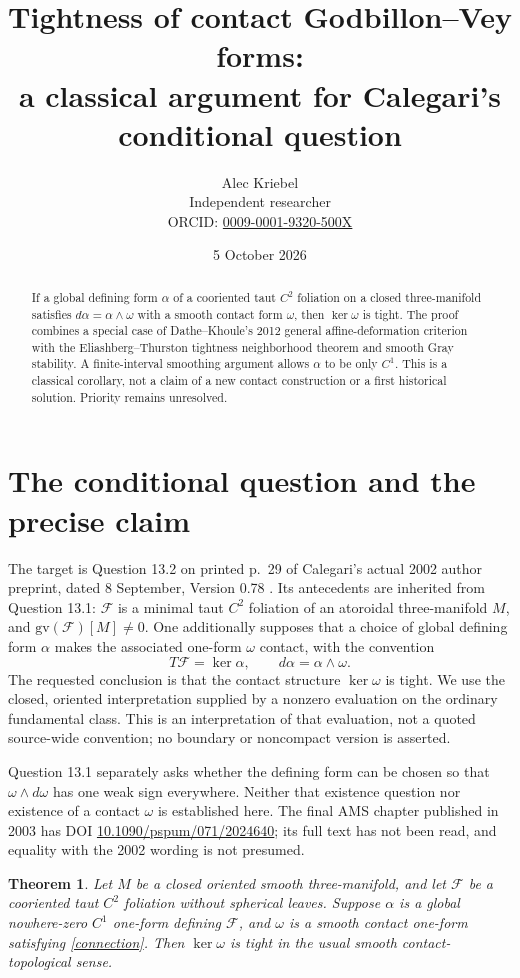 \documentclass[11pt]{article}
\title{Tightness of contact Godbillon--Vey forms:\\
 a classical argument for Calegari's conditional question}
\author{Alec Kriebel\\\small Independent researcher\\
\small ORCID: \href{https://orcid.org/0009-0001-9320-500X}{0009-0001-9320-500X}}
\date{5 October 2026}
\newtheorem{theorem}{Theorem}
\begin{document}
\maketitle
\begin{abstract}
If a global defining form $\alpha$ of a cooriented taut $C^2$ foliation
on a closed three-manifold satisfies $d\alpha=\alpha\wedge\omega$
with a smooth contact form $\omega$, then $\ker\omega$ is tight.
The proof combines a special case of Dathe--Khoule's 2012 general
affine-deformation criterion with the Eliashberg--Thurston tightness
neighborhood theorem and smooth Gray stability. A finite-interval
smoothing argument allows $\alpha$ to be only $C^1$.
This is a classical corollary, not a claim of a new contact construction
or a first historical solution. Priority remains unresolved.
\end{abstract}

\section{The conditional question and the precise claim}
The target is Question 13.2 on printed p.~29 of Calegari's actual
2002 author preprint, dated 8 September, Version 0.78 \cite{C}.
Its antecedents are inherited from Question 13.1: $\mathcal F$ is a
minimal taut $C^2$ foliation of an atoroidal three-manifold $M$,
and $\mathrm{gv}(\mathcal F)[M]\ne0$. One additionally supposes
that a choice of global defining form $\alpha$ makes the associated
one-form $\omega$ contact, with the convention
\begin{equation}
T\mathcal F=\ker\alpha,\qquad d\alpha=\alpha\wedge\omega.
\label{connection}
\end{equation}
The requested conclusion is that the contact structure $\ker\omega$
is tight. We use the closed, oriented interpretation supplied by a
nonzero evaluation on the ordinary fundamental class. This is an
interpretation of that evaluation, not a quoted source-wide convention;
no boundary or noncompact version is asserted.

Question 13.1 separately asks whether the defining form can be chosen
so that $\omega\wedge d\omega$ has one weak sign everywhere.
Neither that existence question nor existence of a contact $\omega$
is established here. The final AMS chapter published in 2003 has DOI
\href{https://doi.org/10.1090/pspum/071/2024640}{10.1090/pspum/071/2024640};
its full text has not been read, and equality with the 2002 wording
is not presumed.

\begin{theorem}\label{main}
Let $M$ be a closed oriented smooth three-manifold, and let
$\mathcal F$ be a cooriented taut $C^2$ foliation without spherical
leaves. Suppose $\alpha$ is a global nowhere-zero $C^1$ one-form
defining $\mathcal F$, and $\omega$ is a smooth contact one-form
satisfying \eqref{connection}. Then $\ker\omega$ is tight in the
usual smooth contact-topological sense.
\end{theorem}
\end{document}
